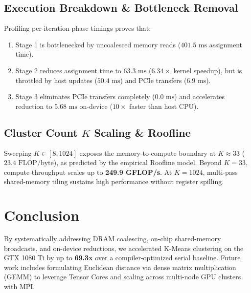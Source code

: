 \documentclass[sigconf,nonacm]{acmart}
\begin{document}
\subsection{Execution Breakdown \& Bottleneck Removal}
Profiling per-iteration phase timings proves that:
\begin{enumerate}
    \item Stage 1 is bottlenecked by uncoalesced memory reads ($401.5\text{ ms}$ assignment time).
    \item Stage 2 reduces assignment time to $63.3\text{ ms}$ ($6.34\times$ kernel speedup), but is throttled by host updates ($50.4\text{ ms}$) and PCIe transfers ($6.9\text{ ms}$).
    \item Stage 3 eliminates PCIe transfers completely ($0.0\text{ ms}$) and accelerates reduction to $5.68\text{ ms}$ on-device ($10\times$ faster than host CPU).
\end{enumerate}

\subsection{Cluster Count $K$ Scaling \& Roofline}
Sweeping $K \in [8, 1024]$ exposes the memory-to-compute boundary at $K \approx 33$ ($23.4\text{ FLOP/byte}$), as predicted by the empirical Roofline model. Beyond $K=33$, compute throughput scales up to \textbf{249.9 GFLOP/s}. At $K=1024$, multi-pass shared-memory tiling sustains high performance without register spilling.

\section{Conclusion}
By systematically addressing DRAM coalescing, on-chip shared-memory broadcasts, and on-device reductions, we accelerated K-Means clustering on the GTX 1080 Ti by up to \textbf{69.3x} over a compiler-optimized serial baseline. Future work includes formulating Euclidean distance via dense matrix multiplication (GEMM) to leverage Tensor Cores and scaling across multi-node GPU clusters with MPI.


\end{document}
